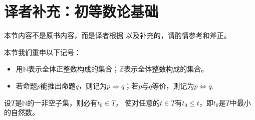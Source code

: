 \section{译者补充：初等数论基础}\label{sec:译者补充：初等数论基础}

\begin{remark}
    本节内容不是原书内容，而是译者根据\citet{ElementaryNumberTheory}
    以及\citet{wiki:ExtendedEuclideanAlgorithm}补充的，请酌情参考和斧正。
\end{remark}

\begin{notation}
    本节我们重申以下记号：
    \begin{itemize}
        \item 用$\mathbb{N}$表示全体正整数构成的集合；$\mathbb{Z}$表示全体整数构成的集合。
        \item 若命题$p$能推出命题$q$，则记为$p\Rightarrow q$；若$p$与$q$等价，则记为$p\Leftrightarrow q$.
    \end{itemize}
\end{notation}


\begin{theorem}\label{theorem:7.ex02.1}
    设$T$是$\mathbb{N}$的一非空子集，则必有$t_0\in T$，
    使对任意的$t\in T$有$t_0\le t$，即$t_0$是$T$中最小的自然数。
\end{theorem}




